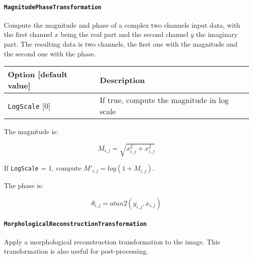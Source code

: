 \documentclass[a4paper,11pt,oneside]{article}
\newcommand{\iponly}{\reversemarginpar
    \marginnote{\color{listletiblue}\normalfont\scriptsize
    {\ttfamily{}\hyperref[sec:N2D2-IP]{\color{listletiblue}N2D2 IP}} \emph{only}}}
\begin{document}
\paragraph{\texorpdfstring{%
\lstinline[basicstyle=\ttfamily\bfseries]!MagnitudePhaseTransformation!}
{MagnitudePhaseTransformation}}
Compute the magnitude and phase of a complex two channels input data, with the
first channel $x$ being the real part and the second channel $y$ the imaginary
part. The resulting data is two channels, the first one with the magnitude and
 the second one with the phase.

\begin{center}
 \begin{tabular}{| p{5cm} | p{10cm} | }
 \hline
 Option [default value] & Description\\
 \hline\hline
  \lstinline!LogScale! [0] & If true, compute the magnitude in log scale \\
 \hline
\end{tabular}
\end{center}

The magnitude is:

\[ M_{i,j} = \sqrt{x_{i,j}^2 + x_{i,j}^2} \]

If \lstinline!LogScale! = 1, compute $M'_{i,j} = log(1 + M_{i,j})$.

The phase is:

\[ \theta_{i,j} = atan2(y_{i,j}, x_{i,j}) \]



\paragraph{\texorpdfstring{%
\lstinline[basicstyle=\ttfamily\bfseries]
!MorphologicalReconstructionTransformation!\protect\iponly}
{MorphologicalReconstructionTransformation}}
Apply a morphological reconstruction transformation to the image.
This transformation is also useful for post-processing.
\end{document}
